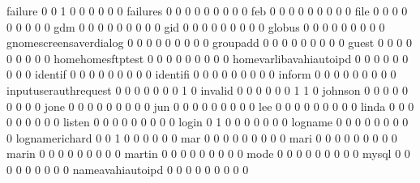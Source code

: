 \documentclass[compress,8pt]{beamer}
\begin{document}
\begin{frame}
\begin{Schunk}
  failure                                    0   0   1   0   0   0   0   0   0
  failures                                   0   0   0   0   0   0   0   0   0
  feb                                        0   0   0   0   0   0   0   0   0
  file                                       0   0   0   0   0   0   0   0   0
  gdm                                        0   0   0   0   0   0   0   0   0
  gid                                        0   0   0   0   0   0   0   0   0
  globus                                     0   0   0   0   0   0   0   0   0
  gnomescreensaverdialog                     0   0   0   0   0   0   0   0   0
  groupadd                                   0   0   0   0   0   0   0   0   0
  guest                                      0   0   0   0   0   0   0   0   0
  homehomesftptest                           0   0   0   0   0   0   0   0   0
  homevarlibavahiautoipd                     0   0   0   0   0   0   0   0   0
  identif                                    0   0   0   0   0   0   0   0   0
  identifi                                   0   0   0   0   0   0   0   0   0
  inform                                     0   0   0   0   0   0   0   0   0
  inputuserauthrequest                       0   0   0   0   0   0   0   1   0
  invalid                                    0   0   0   0   0   0   1   1   0
  johnson                                    0   0   0   0   0   0   0   0   0
  jone                                       0   0   0   0   0   0   0   0   0
  jun                                        0   0   0   0   0   0   0   0   0
  lee                                        0   0   0   0   0   0   0   0   0
  linda                                      0   0   0   0   0   0   0   0   0
  listen                                     0   0   0   0   0   0   0   0   0
  login                                      0   1   0   0   0   0   0   0   0
  logname                                    0   0   0   0   0   0   0   0   0
  lognamerichard                             0   0   1   0   0   0   0   0   0
  mar                                        0   0   0   0   0   0   0   0   0
  mari                                       0   0   0   0   0   0   0   0   0
  marin                                      0   0   0   0   0   0   0   0   0
  martin                                     0   0   0   0   0   0   0   0   0
  mode                                       0   0   0   0   0   0   0   0   0
  mysql                                      0   0   0   0   0   0   0   0   0
  nameavahiautoipd                           0   0   0   0   0   0   0   0   0

\end{Schunk}
\end{frame}
\end{document}
